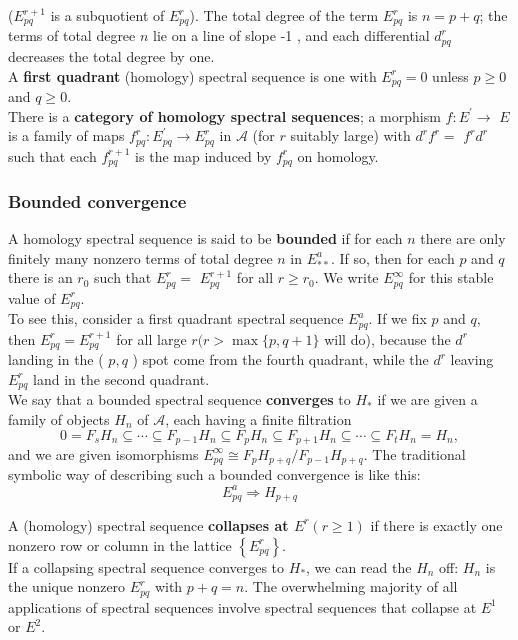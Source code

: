 ($E_{p q}^{r+1}$ is a subquotient of $E_{p q}^r$). The total degree of the term $E_{p q}^r$ is $n=p+q$; the terms of total degree $n$ lie on a line of slope -1 , and each differential $d_{p q}^r$ decreases the total degree by one.\\
A \textbf{first quadrant} (homology) spectral sequence is one with $E_{p q}^r=0$ unless $p \geq 0$ and $q \geq 0$.\\

There is a \textbf{category of homology spectral sequences}; a morphism $f: E^{\prime} \rightarrow$ $E$ is a family of maps $f_{p q}^r: E_{p q}^{\prime} \rightarrow E_{p q}^r$ in $\mathcal{A}$ (for $r$ suitably large) with $d^r f^r=$ $f^r d^r$ such that each $f_{p q}^{r+1}$ is the map induced by $f_{p q}^r$ on homology.

\subsubsection{Bounded convergence}

A homology spectral sequence is said to be \textbf{bounded} if for each $n$ there are only finitely many nonzero terms of total degree $n$ in $E_{* *}^a$. If so, then for each $p$ and $q$ there is an $r_0$ such that $E_{p q}^r=$ $E_{p q}^{r+1}$ for all $r \geq r_0$. We write $E_{p q}^{\infty}$ for this stable value of $E_{p q}^r$.\\
To see this, consider a first quadrant spectral sequence $E^a _{pq}$. If we fix $p$ and $q$, then $E_{p q}^r=E_{p q}^{r+1}$ for all large $r(r>\max \{p, q+1\}$ will do), because the $d^r$ landing in the ( $p, q$ ) spot come from the fourth quadrant, while the $d^r$ leaving $E_{p q}^r$ land in the second quadrant.\\ 

We say that a bounded spectral sequence \textbf{converges} to $H_*$ if we are given a family of objects $H_n$ of $\mathcal{A}$, each having a finite filtration
$$
0=F_s H_n \subseteq \cdots \subseteq F_{p-1} H_n \subseteq F_p H_n \subseteq F_{p+1} H_n \subseteq \cdots \subseteq F_t H_n=H_n,
$$
and we are given isomorphisms $E_{p q}^{\infty} \cong F_p H_{p+q} / F_{p-1} H_{p+q}$. The traditional symbolic way of describing such a bounded convergence is like this:
$$
E_{p q}^a \Rightarrow H_{p+q}
$$

A (homology) spectral sequence \textbf{collapses at $E^r(r \geq 1)$ } if there is exactly one nonzero row or column in the lattice $\left\{E_{p q}^r\right\}$.\\
If a collapsing spectral sequence converges to $H_*$, we can read the $H_n$ off: $H_n$ is the unique nonzero $E_{p q}^r$ with $p+q=n$. The overwhelming majority of all applications of spectral sequences involve spectral sequences that collapse at $E^1$ or $E^2$.\\

